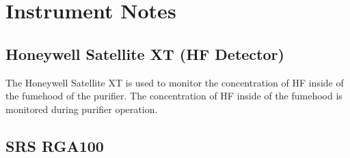 %
%

\section{Instrument Notes}

\subsection{Honeywell Satellite XT (HF Detector)}

The Honeywell Satellite XT is used to monitor the concentration of HF
inside of the fumehood of the purifier. The concentration of HF inside of the
fumehood is monitored during purifier operation.





\subsection{SRS RGA100}

